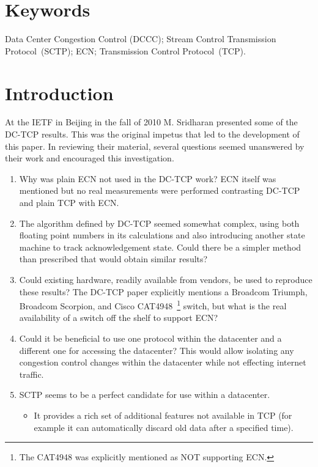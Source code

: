 \documentclass[12pt]{article}
\begin{document}
\section*{Keywords}
Data Center Congestion Control (DCCC);
Stream Control Transmission Protocol~(SCTP);
ECN;
Transmission Control Protocol~(TCP).

\section{Introduction}
At the IETF in Beijing in the fall of 2010 M. Sridharan presented some of the DC-TCP results.
This was the original impetus that led to the development of
this paper. In reviewing their material, several questions seemed unanswered by their
work and encouraged this investigation.

\begin{enumerate}
\item Why was plain ECN not used in the DC-TCP work? ECN itself was mentioned but no
real measurements were performed contrasting DC-TCP and plain TCP with ECN.

\item The algorithm defined by DC-TCP seemed somewhat complex,  using
both floating point numbers in its calculations and also introducing
another state machine to track acknowledgement state.  Could there be a simpler method than prescribed that would obtain similar results?

\item Could existing hardware, readily available from vendors, be used to reproduce these results? The
DC-TCP paper explicitly mentions a  Broadcom Triumph,  Broadcom Scorpion, and Cisco CAT4948~\footnote{The 
CAT4948 was explicitly mentioned as NOT supporting ECN.} switch, but what is the real availability of 
a switch off the shelf to support ECN?

\item Could it be beneficial to use one protocol within the
      datacenter and a different one for accessing the datacenter?
      This would allow isolating any congestion control changes within the datacenter
      while not effecting internet traffic.

\item SCTP seems to be a perfect candidate for use within a datacenter.

\begin{itemize}
\item It provides a rich set of additional features not available in
      TCP (for example it can automatically discard old data after a specified time). 


\end{itemize}
\end{enumerate}
\end{document}
